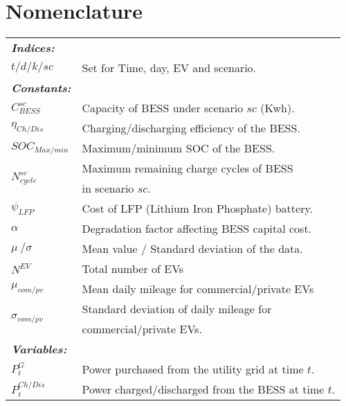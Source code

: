 \documentclass[10pt, journal]{IEEEtran}
\begin{document}
\vspace{-3mm}
\section*{Nomenclature}
{\small
\setlength{\tabcolsep}{2pt}
\renewcommand{\arraystretch}{1.3}
\begin{center}
\centering
\begin{tabular*}{\columnwidth}{l @{\extracolsep{\fill}} l}
\textbf{\textit{Indices:}} &  \\
\(t/d/k/sc\) & Set for Time, day, EV and scenario.  \\
\textbf{\textit{Constants:}} &  \\
\(C_{BESS}^{sc}\) & Capacity of BESS under scenario \(sc\) (Kwh). \\
\(\eta_{Ch/Dis}\) & Charging/discharging efficiency of the BESS. \\
\(SOC_{Max/min}\) & Maximum/minimum SOC of the BESS. \\
\multirow{2}{*}{\(N_{cycle}^{sc}\)} & Maximum remaining charge cycles of BESS \\
& in scenario \(sc\). \\ 
\(\psi_{LFP}\) & Cost of LFP (Lithium Iron Phosphate) battery. \\
\(\alpha\) & Degradation factor affecting BESS capital cost. \\
\(\mu\ / \sigma\) & Mean value / Standard deviation of the data. \\
\( N^{EV} \) & Total number of EVs \\
\( \mu_{com/pv} \) & Mean daily mileage for commercial/private EVs \\
\multirow{2}{*}{\( \sigma_{com/pv} \)} & Standard deviation of daily mileage for \\ 
 & commercial/private EVs. \\
\textbf{\textit{Variables:}} &  \\
\(P_t^{G}\)  & Power purchased from the utility grid at time \(t\). \\
\(P_t^{Ch/Dis}\)  & Power charged/discharged from the BESS at time \(t\). \\
\end{tabular*}
\end{center}}
\end{document}
